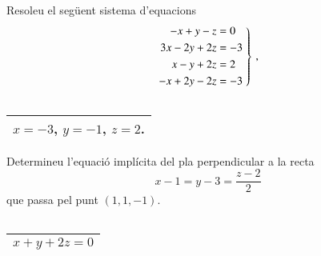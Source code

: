 \documentclass[11pt,catalan]{article}
\begin{document}
\begin{enunciat}
Resoleu el següent sistema d'equacions
\[
  \left.\aligned - x + y - z &= 0 \\ 3 x - 2 y + 2 z &= -3 \\ x - y + 2 z &= 2 \\ - x + 2 y - 2 z &= -3 \endaligned\;\right\}\,,
\]
\end{enunciat}

\begin{quadricula}
\begin{tabular}{|C{5cm}{0.5cm}|}
\hline
  \\
\hline
\end{tabular}
\end{quadricula}

\begin{solucio}
\begin{center}
\begin{tabular}{|C{5cm}{0.5cm}|}
\hline
$x=-3$, $y=-1$, $z=2$. \\
\hline
\end{tabular}
\end{center}
\end{solucio}


\begin{enunciat}
Determineu l'equació implícita del pla perpendicular a la recta 
\[
  x - 1 = y - 3 = \frac{z - 2}{2}
\]
que passa pel punt $(1,1,-1)$.
\end{enunciat}

\begin{quadricula}
\begin{tabular}{|C{5cm}{0.5cm}|}
\hline
  \\
\hline
\end{tabular}
\end{quadricula}

\begin{solucio}
\begin{center}
\begin{tabular}{|C{5cm}{0.5cm}|}
\hline
$x + y + 2 z = 0$ \\
\hline
\end{tabular}
\end{center}
\end{solucio}
\end{document}
